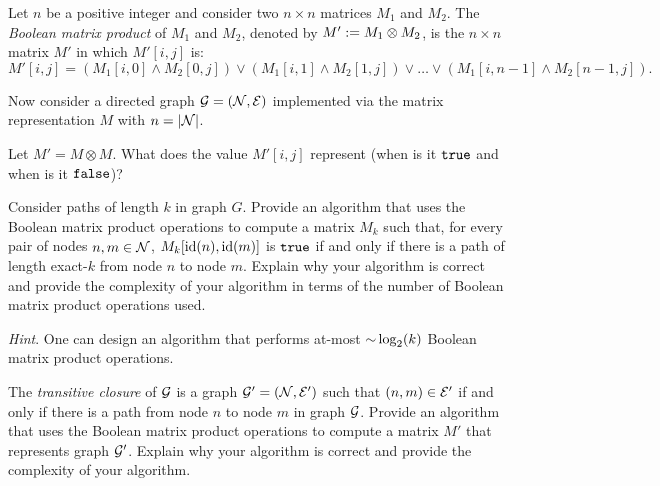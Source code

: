 \begin{problem}
Let $n$ be a positive integer and consider two $n \times n$ matrices $M_1$ and $M_2$. The \emph{Boolean matrix product} of $M_1$ and $M_2$, denoted by $M' := M_1 \otimes M_2$, is the $n \times n$ matrix $M'$ in which $M'[i, j]$ is:
\[ M'[i, j] = (M_1[i, 0] \land M_2[0, j]) \lor (M_1[i, 1] \land M_2[1, j]) \lor \dots \lor (M_1[i, n-1] \land M_2[n-1,j]). \]

Now consider a directed graph $\mathcal{G} = (\mathcal{N}, \mathcal{E})$ implemented via the matrix representation $M$ with $n = \lvert \mathcal{N} \rvert$.
\begin{questions}
\item Let $M' = M \otimes M$. What does the value $M'[i,j]$ represent (when is it $\texttt{true}$ and when is it $\texttt{false}$)?
\item Consider paths of length $k$ in graph $G$. Provide an algorithm that uses the Boolean matrix product operations to compute a matrix $M_k$ such that, for every pair of nodes $n, m \in \mathcal{N}$, $M_k[\operatorname{id}(n), \operatorname{id}(m)]$ is $\texttt{true}$ if and only if there is a path of length exact-$k$ from node $n$ to node $m$. Explain why your algorithm is correct and provide the complexity of your algorithm in terms of the number of Boolean matrix product operations used.

\textit{Hint}. One can design an algorithm that performs at-most $\mathord{\sim}\log_2(k)$ Boolean matrix product operations.
\item The \emph{transitive closure} of $\mathcal{G}$ is a graph $\mathcal{G}' = (\mathcal{N}, \mathcal{E}')$ such that $(n, m) \in \mathcal{E}'$ if and only if there is a path from node $n$ to node $m$ in graph $\mathcal{G}$. Provide an algorithm that uses the Boolean matrix product operations to compute a matrix $M'$ that represents graph $\mathcal{G}'$. Explain why your algorithm is correct and provide the complexity of your algorithm.
\end{questions}
\end{problem}

